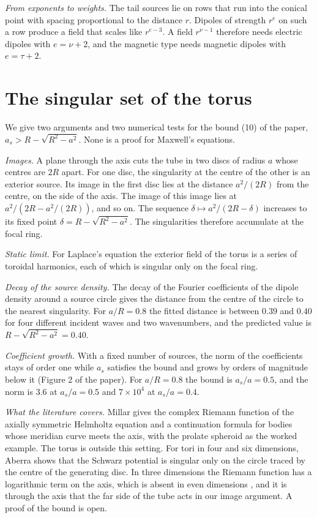 \documentclass[preprint,11pt]{elsarticle}
\begin{document}
\emph{From exponents to weights.} The tail sources lie on rows that run into the conical point with spacing proportional to the distance $r$. Dipoles of strength $r^{e}$ on such a row produce a field that scales like $r^{e-3}$. A field $r^{\nu-1}$ therefore needs electric dipoles with $e = \nu+2$, and the magnetic type needs magnetic dipoles with $e = \tau+2$.

\section{The singular set of the torus}
\label{sup:torus}

We give two arguments and two numerical tests for the bound (10) of the paper, $a_s > R - \sqrt{R^2-a^2}$. None is a proof for Maxwell's equations.

\emph{Images.} A plane through the axis cuts the tube in two discs of radius $a$ whose centres are $2R$ apart. For one disc, the singularity at the centre of the other is an exterior source. Its image in the first disc lies at the distance $a^2/(2R)$ from the centre, on the side of the axis. The image of this image lies at $a^2/(2R - a^2/(2R))$, and so on. The sequence $\delta\mapsto a^2/(2R-\delta)$ increases to its fixed point $\delta = R - \sqrt{R^2-a^2}$. The singularities therefore accumulate at the focal ring.

\emph{Static limit.} For Laplace's equation the exterior field of the torus is a series of toroidal harmonics, each of which is singular only on the focal ring.

\emph{Decay of the source density.} The decay of the Fourier coefficients of the dipole density around a source circle gives the distance from the centre of the circle to the nearest singularity. For $a/R = 0.8$ the fitted distance is between $0.39$ and $0.40$ for four different incident waves and two wavenumbers, and the predicted value is $R - \sqrt{R^2-a^2} = 0.40$.

\emph{Coefficient growth.} With a fixed number of sources, the norm of the coefficients stays of order one while $a_s$ satisfies the bound and grows by orders of magnitude below it (Figure 2 of the paper). For $a/R = 0.8$ the bound is $a_s/a = 0.5$, and the norm is $3.6$ at $a_s/a = 0.5$ and $7\times10^{4}$ at $a_s/a = 0.4$.

\emph{What the literature covers.} Millar \cite{millar1983} gives the complex Riemann function of the axially symmetric Helmholtz equation and a continuation formula for bodies whose meridian curve meets the axis, with the prolate spheroid as the worked example. The torus is outside this setting. For tori in four and six dimensions, Aberra \cite{aberra2002} shows that the Schwarz potential is singular only on the circle traced by the centre of the generating disc. In three dimensions the Riemann function has a logarithmic term on the axis, which is absent in even dimensions \cite{millar1983}, and it is through the axis that the far side of the tube acts in our image argument. A proof of the bound is open.
\end{document}
